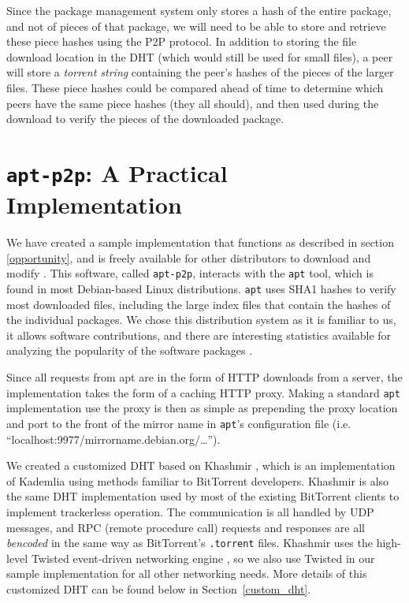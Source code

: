 \documentclass[conference]{IEEEtran}
\begin{document}
Since the package management system only stores a hash of the entire
package, and not of pieces of that package, we will need to be able
to store and retrieve these piece hashes using the P2P protocol. In
addition to storing the file download location in the DHT (which
would still be used for small files), a peer will store a
\emph{torrent string} containing the peer's hashes of the pieces of
the larger files. These piece hashes could be compared ahead of time
to determine which peers have the same piece hashes (they all
should), and then used during the download to verify the pieces of
the downloaded package.


\section{\texttt{apt-p2p}: A Practical Implementation}
\label{implementation}

We have created a sample implementation that functions as described
in section \ref{opportunity}, and is freely available for other
distributors to download and modify \cite{apt-p2p}. This software,
called \texttt{apt-p2p}, interacts with the \texttt{apt} tool, which
is found in most Debian-based Linux distributions. \texttt{apt} uses
SHA1 hashes to verify most downloaded files, including the large
index files that contain the hashes of the individual packages. We
chose this distribution system as it is familiar to us, it allows
software contributions, and there are interesting statistics
available for analyzing the popularity of the software packages
\cite{popcon}.

Since all requests from apt are in the form of HTTP downloads from a
server, the implementation takes the form of a caching HTTP proxy.
Making a standard \texttt{apt} implementation use the proxy is then
as simple as prepending the proxy location and port to the front of
the mirror name in \texttt{apt}'s configuration file (i.e.
``localhost:9977/mirrorname.debian.org/\ldots'').

We created a customized DHT based on Khashmir \cite{khashmir}, which
is an implementation of Kademlia \cite{kademlia} using methods
familiar to BitTorrent developers. Khashmir is also the same DHT
implementation used by most of the existing BitTorrent clients to
implement trackerless operation. The communication is all handled by
UDP messages, and RPC (remote procedure call) requests and responses
are all \emph{bencoded} in the same way as BitTorrent's
\texttt{.torrent} files. Khashmir uses the high-level Twisted
event-driven networking engine \cite{twisted}, so we also use
Twisted in our sample implementation for all other networking needs.
More details of this customized DHT can be found below in
Section~\ref{custom_dht}.
\end{document}
